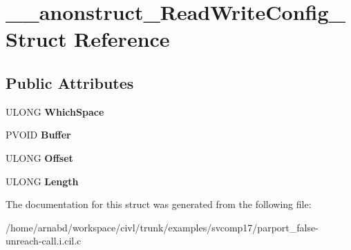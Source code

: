 \hypertarget{struct____anonstruct__ReadWriteConfig__74}{}\section{\+\_\+\+\_\+anonstruct\+\_\+\+Read\+Write\+Config\+\_ Struct Reference}
\label{struct____anonstruct__ReadWriteConfig__74}
\subsection*{Public Attributes}
\begin{DoxyCompactItemize}
\item 
\hypertarget{struct____anonstruct__ReadWriteConfig__74_ae4969b8662d0ed1c023f5224de39fc32}{}U\+L\+O\+N\+G {\bfseries Which\+Space}\label{struct____anonstruct__ReadWriteConfig__74_ae4969b8662d0ed1c023f5224de39fc32}

\item 
\hypertarget{struct____anonstruct__ReadWriteConfig__74_a5883e6526162a527fb7da755935561e7}{}P\+V\+O\+I\+D {\bfseries Buffer}\label{struct____anonstruct__ReadWriteConfig__74_a5883e6526162a527fb7da755935561e7}

\item 
\hypertarget{struct____anonstruct__ReadWriteConfig__74_aad334c7a8b0c552557bbfbfcbc47e75b}{}U\+L\+O\+N\+G {\bfseries Offset}\label{struct____anonstruct__ReadWriteConfig__74_aad334c7a8b0c552557bbfbfcbc47e75b}

\item 
\hypertarget{struct____anonstruct__ReadWriteConfig__74_a213285cf56d955c3f17a48b723a2df72}{}U\+L\+O\+N\+G {\bfseries Length}\label{struct____anonstruct__ReadWriteConfig__74_a213285cf56d955c3f17a48b723a2df72}

\end{DoxyCompactItemize}


The documentation for this struct was generated from the following file\+:\begin{DoxyCompactItemize}
\item 
/home/arnabd/workspace/civl/trunk/examples/svcomp17/parport\+\_\+false-\/unreach-\/call.\+i.\+cil.\+c\end{DoxyCompactItemize}

